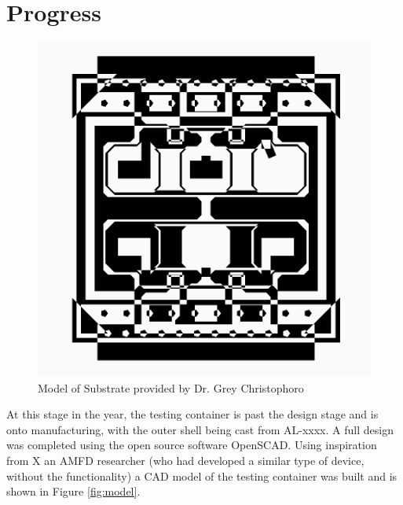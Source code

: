 \documentclass[a4paper,11pt]{article}
\begin{document}
\section{Progress}\begin{figure} 
\includegraphics[width=\linewidth]{fig2}
\caption{Model of Substrate provided by Dr. Grey Christophoro\label{fig:substrate}}
\end{figure}At this stage in the year, the testing container is past the design stage and is onto manufacturing, with the outer shell being cast from AL-xxxx. A full design was completed using the open source software OpenSCAD. Using inspiration from X an AMFD researcher (who had developed a similar type of device, without the functionality) a CAD model of the testing container was built and is shown in Figure \ref{fig:model}.\\ 
\end{document}

